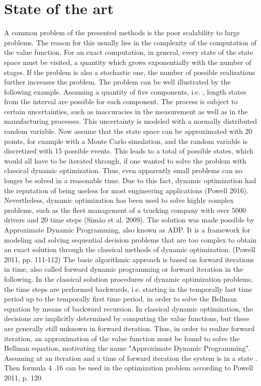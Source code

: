 \section{State of the art}
A common problem of the presented methods is the poor scalability to large problems. The reason for this usually lies in the complexity of the computation of the value function. For an exact computation, in general, every state of the state space must be visited, a quantity which grows exponentially with the number of stages. If the problem is also a stochastic one, the number of possible realizations further increases the problem. The problem can be well illustrated by the following example.
Assuming a quantity of five components, i.e. , length states from the interval are possible for each component. The process is subject to certain uncertainties, such as inaccuracies in the measurement as well as in the manufacturing processes. This uncertainty is modeled with a normally distributed random variable. Now assume that the state space can be approximated with 20 points, for example with a Monte Carlo simulation, and the random variable is discretized with 15 possible events. This leads to a total of possible states, which would all have to be iterated through, if one wanted to solve the problem with classical dynamic optimization. Thus, even apparently small problems can no longer be solved in a reasonable time. Due to this fact, dynamic optimization had the reputation of being useless for most engineering applications (Powell 2016). Nevertheless, dynamic optimization has been used to solve highly complex problems, such as the fleet management of a trucking company with over 5000 drivers and 20 time steps (Simão et al. 2009). The solution was made possible by Approximate Dynamic Programming, also known as ADP. It is a framework for modeling and solving sequential decision problems that are too complex to obtain an exact solution through the classical methods of dynamic optimization. (Powell 2011, pp. 111-112)
The basic algorithmic approach is based on forward iterations in time, also called forward dynamic programming or forward iteration in the following. In the classical solution procedures of dynamic optimization problems, the time steps are performed backwards, i.e. starting in the temporally last time period up to the temporally first time period, in order to solve the Bellman equation by means of backward recursion. In classical dynamic optimization, the decisions are implicitly determined by computing the value functions, but these are generally still unknown in forward iteration. Thus, in order to realize forward iteration, an approximation of the value function must be found to solve the Bellman equation, motivating the name "Approximate Dynamic Programming". 
Assuming at an iteration and a time of forward iteration the system is in a state . Then formula 4 .16 can be used in the optimization problem according to Powell 2011, p. 120.




